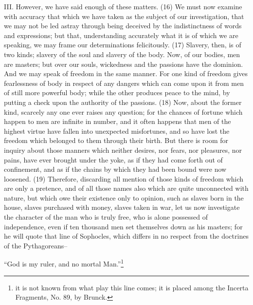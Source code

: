 III. However, we have said enough of these matters. (16) We must now examine with accuracy
that which we have taken as the subject of our investigation, that we may not be led astray through
being deceived by the indistinctness of words and expressions; but that, understanding accurately
what it is of which we are speaking, we may frame our determinations felicitously. (17) Slavery,
then, is of two kinds; slavery of the soul and slavery of the body. Now, of our bodies, men are
masters; but over our souls, wickedness and the passions have the dominion. And we may speak
of freedom in the same manner. For one kind of freedom gives fearlessness of body in respect of
any dangers which can come upon it from men of still more powerful body; while the other
produces peace to the mind, by putting a check upon the authority of the passions. (18) Now,
about the former kind, scarcely any one ever raises any question; for the chances of fortune which
happen to men are infinite in number, and it often happens that men of the highest virtue have
fallen into unexpected misfortunes, and so have lost the freedom which belonged to them through
their birth. But there is room for inquiry about those manners which neither desires, nor fears, nor
pleasures, nor pains, have ever brought under the yoke, as if they had come forth out of
confinement, and as if the chains by which they had been bound were now loosened. (19)
Therefore, discarding all mention of those kinds of freedom which are only a pretence, and of all
those names also which are quite unconnected with nature, but which owe their existence only to
opinion, such as slaves born in the house, slaves purchased with money, slaves taken in war, let
us now investigate the character of the man who is truly free, who is alone possessed of
independence, even if ten thousand men set themselves down as his masters; for he will quote that
line of Sophocles, which differs in no respect from the doctrines of the Pythagoreans--

``God is my ruler, and no mortal Man.''\footnote{it is not known from what play this line comes; it is placed among the
Incerta Fragments, No. 89, by Brunck.}

